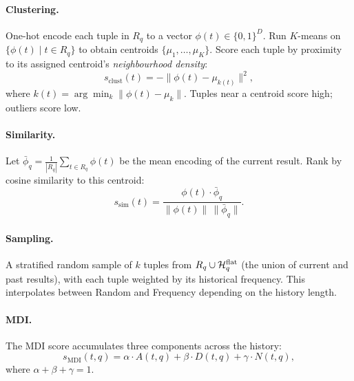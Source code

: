 \paragraph{Clustering.}
One-hot encode each tuple in $R_q$ to a vector $\phi(t) \in \{0,1\}^D$.  Run
$K$-means on $\{\phi(t) \mid t \in R_q\}$ to obtain centroids
$\{\mu_1, \ldots, \mu_K\}$.  Score each tuple by proximity to its assigned
centroid's \emph{neighbourhood density}:
\begin{equation}
  s_{\mathrm{clust}}(t) = -\|\phi(t) - \mu_{k(t)}\|^2,
  \label{eq:clust-score}
\end{equation}
where $k(t) = \arg\min_k \|\phi(t) - \mu_k\|$.  Tuples near a centroid score
high; outliers score low.

\paragraph{Similarity.}
Let $\bar{\phi}_q = \frac{1}{|R_q|}\sum_{t \in R_q}\phi(t)$ be the mean
encoding of the current result.  Rank by cosine similarity to this centroid:
\begin{equation}
  s_{\mathrm{sim}}(t) = \frac{\phi(t) \cdot \bar{\phi}_q}{\|\phi(t)\|\,\|\bar{\phi}_q\|}.
  \label{eq:sim-score}
\end{equation}

\paragraph{Sampling.}
A stratified random sample of $k$ tuples from $R_q \cup \mathcal{H}_{q}^{\rm flat}$
(the union of current and past results), with each tuple weighted by its
historical frequency.  This interpolates between Random and Frequency depending
on the history length.

\paragraph{MDI.}
The MDI score accumulates three components across the history:
\begin{equation}
  s_{\mathrm{MDI}}(t, q)
  = \alpha \cdot A(t, q) + \beta \cdot D(t, q) + \gamma \cdot N(t, q),
  \label{eq:mdi-score}
\end{equation}
where $\alpha + \beta + \gamma = 1$.


